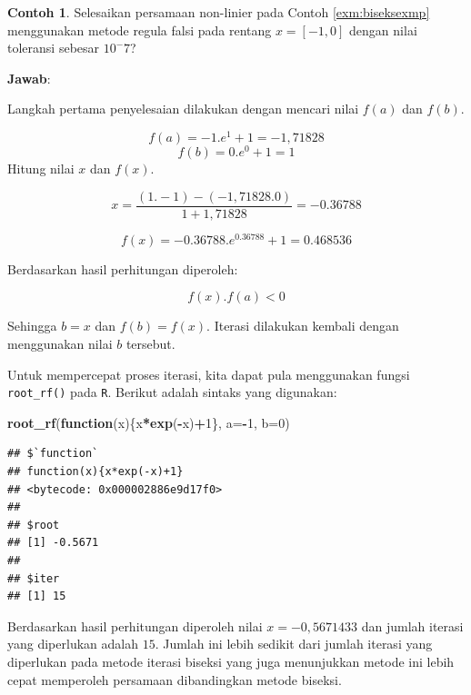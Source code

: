 \documentclass[
]{book}
\newenvironment{Shaded}{\begin{snugshade}}{\end{snugshade}}
\newcommand{\AttributeTok}[1]{\textcolor[rgb]{0.13,0.29,0.53}{#1}}
\newcommand{\ControlFlowTok}[1]{\textcolor[rgb]{0.13,0.29,0.53}{\textbf{#1}}}
\newcommand{\DecValTok}[1]{\textcolor[rgb]{0.00,0.00,0.81}{#1}}
\newcommand{\FunctionTok}[1]{\textcolor[rgb]{0.13,0.29,0.53}{\textbf{#1}}}
\newcommand{\NormalTok}[1]{#1}
\newcommand{\SpecialCharTok}[1]{\textcolor[rgb]{0.81,0.36,0.00}{\textbf{#1}}}
\theoremstyle{definition}
\theoremstyle{definition}
\newtheorem{example}{Contoh}[chapter]
\theoremstyle{definition}
\theoremstyle{definition}
\theoremstyle{remark}
\begin{document}
\begin{example}
\protect\hypertarget{exm:rfexmp}{}\label{exm:rfexmp}Selesaikan persamaan non-linier pada Contoh \ref{exm:biseksexmp} menggunakan metode regula falsi pada rentang \(x=\left[-1,0 \right]\) dengan nilai toleransi sebesar \(10^-7\)?
\end{example}

\textbf{Jawab}:

Langkah pertama penyelesaian dilakukan dengan mencari nilai \(f\left(a \right)\) dan \(f\left(b \right)\).

\[
f\left(a \right)=-1.e^{1}+1=-1,71828
\]
\[
f\left(b \right)=0.e^{0}+1=1
\]
Hitung nilai \(x\) dan \(f\left(x \right)\).

\[
x=\frac{\left(1.-1\right)-\left(-1,71828.0\right)}{1+1,71828}=-0.36788
\]

\[
f\left(x \right)=-0.36788.e^{0.36788}+1=0.468536
\]

Berdasarkan hasil perhitungan diperoleh:

\[
f\left(x \right).f\left(a \right)<0
\]

Sehingga \(b=x\) dan \(f\left(b \right)=f\left(x \right)\). Iterasi dilakukan kembali dengan menggunakan nilai \(b\) tersebut.

Untuk mempercepat proses iterasi, kita dapat pula menggunakan fungsi \texttt{root\_rf()} pada \texttt{R}. Berikut adalah sintaks yang digunakan:

\begin{Shaded}
\begin{Highlighting}[]
\FunctionTok{root\_rf}\NormalTok{(}\ControlFlowTok{function}\NormalTok{(x)\{x}\SpecialCharTok{*}\FunctionTok{exp}\NormalTok{(}\SpecialCharTok{{-}}\NormalTok{x)}\SpecialCharTok{+}\DecValTok{1}\NormalTok{\},}
               \AttributeTok{a=}\SpecialCharTok{{-}}\DecValTok{1}\NormalTok{, }\AttributeTok{b=}\DecValTok{0}\NormalTok{)}
\end{Highlighting}
\end{Shaded}

\begin{verbatim}
## $`function`
## function(x){x*exp(-x)+1}
## <bytecode: 0x000002886e9d17f0>
## 
## $root
## [1] -0.5671
## 
## $iter
## [1] 15
\end{verbatim}

Berdasarkan hasil perhitungan diperoleh nilai \(x=-0,5671433\) dan jumlah iterasi yang diperlukan adalah \(15\). Jumlah ini lebih sedikit dari jumlah iterasi yang diperlukan pada metode iterasi biseksi yang juga menunjukkan metode ini lebih cepat memperoleh persamaan dibandingkan metode biseksi.
\end{document}
